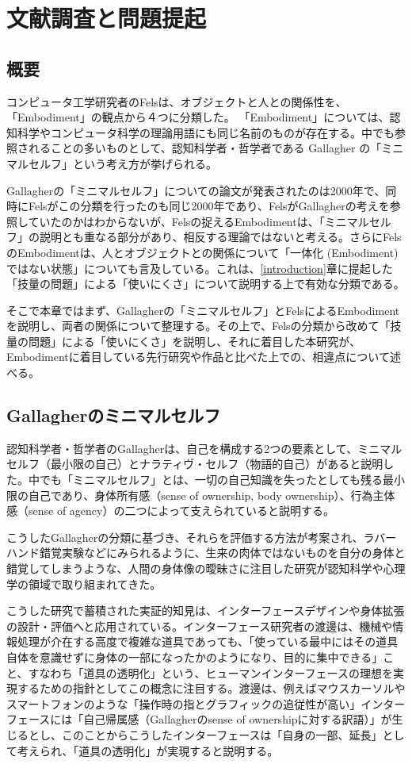 \chapter{文献調査と問題提起}
\label{related_works}
\section{概要}
コンピュータ工学研究者のFelsは、オブジェクトと人との関係性を、「Embodiment」の観点から４つに分類した\cite{Fels}。
「Embodiment」については、認知科学やコンピュータ科学の理論用語にも同じ名前のものが存在する。中でも参照されることの多いものとして、認知科学者・哲学者である Gallagher\cite{Gallagher2000} の「ミニマルセルフ」という考え方が挙げられる。

Gallagherの「ミニマルセルフ」についての論文が発表されたのは2000年で、同時にFelsがこの分類を行ったのも同じ2000年であり、FelsがGallagherの考えを参照していたのかはわからないが、Felsの捉えるEmbodimentは、「ミニマルセルフ」の説明とも重なる部分があり、相反する理論ではないと考える。さらにFelsのEmbodimentは、人とオブジェクトとの関係について「一体化 (Embodiment) ではない状態」についても言及している。これは、\ref{introduction}章に提起した「技量の問題」による「使いにくさ」について説明する上で有効な分類である。

そこで本章ではまず、Gallagherの「ミニマルセルフ」とFelsによるEmbodimentを説明し、両者の関係について整理する。その上で、Felsの分類から改めて「技量の問題」による「使いにくさ」を説明し、それに着目した本研究が、Embodimentに着目している先行研究や作品と比べた上での、相違点について述べる。

\section{Gallagherのミニマルセルフ}
認知科学者・哲学者のGallagher\cite{Gallagher2000}は、自己を構成する2つの要素として、ミニマルセルフ（最小限の自己）とナラティヴ・セルフ（物語的自己）があると説明した。中でも「ミニマルセルフ」とは、一切の自己知識を失ったとしても残る最小限の自己であり、身体所有感（sense of ownership, body ownership）、行為主体感（sense of agency）の二つによって支えられていると説明する。

こうしたGallagherの分類に基づき、それらを評価する方法が考案され、ラバーハンド錯覚実験などにみられるように、生来の肉体ではないものを自分の身体と錯覚してしまうような、人間の身体像の曖昧さに注目した研究が認知科学や心理学の領域で取り組まれてきた。

こうした研究で蓄積された実証的知見は、インターフェースデザインや身体拡張の設計・評価へと応用されている。インターフェース研究者の渡邊は、機械や情報処理が介在する高度で複雑な道具であっても、「使っている最中にはその道具自体を意識せずに身体の一部になったかのようになり、目的に集中できる」こと、すなわち「道具の透明化」という、ヒューマンインターフェースの理想を実現するための指針としてこの概念に注目する。渡邊は、例えばマウスカーソルやスマートフォンのような「操作時の指とグラフィックの追従性が高い」インターフェースには「自己帰属感（Gallagherのsense of ownershipに対する訳語）」が生じるとし、このことからこうしたインターフェースは「自身の一部、延長」として考えられ、「道具の透明化」が実現すると説明する\cite{Watanabe2013}\cite{Watanabe2017}。

